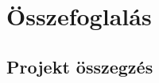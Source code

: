 %
\chapter{Összefoglalás}

\thispagestyle{fancy}

\section{Projekt összegzés}

\begin{munka}
\end{munka}

\begin{forrassor}
\end{forrassor}

